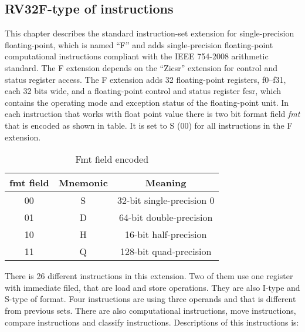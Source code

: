 \documentclass{scrreprt}
\begin{document}
\newpage
\subsection*{RV32F-type of instructions}
This chapter describes the standard instruction-set extension for single-precision floating-point, which is named “F” and adds single-precision floating-point computational instructions compliant with the IEEE 754-2008 arithmetic standard. The F extension depends on the “Zicsr” extension for control and status register access.
The F extension adds 32 floating-point registers, f0–f31, each 32 bits wide, and a floating-point control and status register fcsr, which contains the operating mode and exception status of the floating-point unit.
In each instruction that works with float point value there is two bit format field \textit{fmt} that is encoded as shown in table. It is set to S (00) for all instructions in the F extension.
 \begin{table}[htb!]
        \centering
        \begin{tabular}{|c|c|c|} \hline 
            fmt field & Mnemonic & Meaning \\ \hline 
            00 & S & 32-bit single-precision 0 \\ \hline 
            01 & D & 64-bit double-precision \\ \hline 
            10 & H & 16-bit half-precision \\ \hline 
            11 & Q & 128-bit quad-precision \\ \hline  
        \end{tabular}
        \caption{Fmt field encoded}
        \label{tab:fmt}
    \end{table}
\newline
There is 26 different instructions in this extension. Two of them use one register with immediate filed, that are load and store operations. They are also I-type and S-type of format. Four instructions are using three operands and that is different from previous sets. There are also computational instructions, move instructions, compare instructions and classify instructions. Descriptions of this instructions is:
\end{document}
